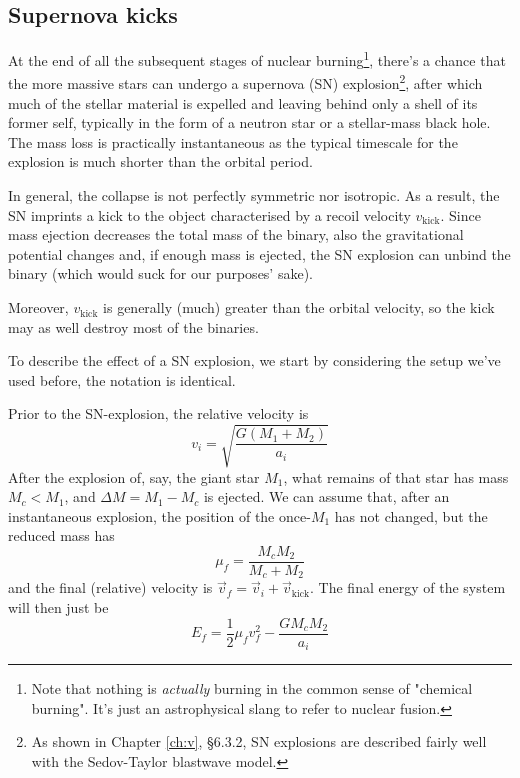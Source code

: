 \subsection{Supernova kicks}
At the end of all the subsequent stages of nuclear burning\footnote{Note that nothing is \emph{actually} burning in the common sense of "chemical burning". It's just an astrophysical slang to refer to nuclear fusion.}, there's a chance that the more massive stars can undergo a supernova (SN) explosion\footnote{As shown in Chapter \ref{ch:v}, §6.3.2, SN explosions are described fairly well with the Sedov-Taylor blastwave model.}, after which much of the stellar material is expelled and leaving behind only a shell of its former self, typically in the form of a neutron star or a stellar-mass black hole. The mass loss is practically instantaneous as the typical timescale for the explosion is much shorter than the orbital period.
\par In general, the collapse is not perfectly
symmetric nor isotropic. As a result, the SN imprints a kick to the object characterised by a recoil velocity $v_{\text{kick}}$. Since mass ejection decreases the total mass of the binary, also the gravitational potential changes and, if enough mass is ejected, the SN explosion can unbind the binary (which would suck for our purposes' sake).
\par Moreover, $v_{\text{kick}}$ is generally (much) greater than the orbital velocity, so the kick may as well destroy most of the binaries.
\par To describe the effect of a SN explosion, we start by considering the setup we've used before, the notation is identical.
\par Prior to the SN-explosion, the relative velocity is 
\begin{equation*}
    v_{i} = \sqrt{\frac{G(M_{1}+M_{2})}{a_{i}}}
\end{equation*}
After the explosion of, say, the giant star $M_{1}$, what remains of that star has mass $M_{c}<M_{1}$, and $\Delta M = M_{1}-M_{c}$ is ejected. We can assume that, after an instantaneous explosion, the position of the once-$M_{1}$ has not changed, but the reduced mass has
\begin{equation*}
    \mu_{f} = \frac{M_{c}M_{2}}{M_{c}+M_{2}}
\end{equation*}
and the final (relative) velocity is $\vec{v}_{f} = \vec{v}_{i}+\vec{v}_{\text{kick}}$. The final energy of the system will then just be
\begin{equation*}
    E_{f} = \frac{1}{2}\mu_{f}v_{f}^{2}-\frac{GM_{c}M_{2}}{a_{i}}
\end{equation*}
